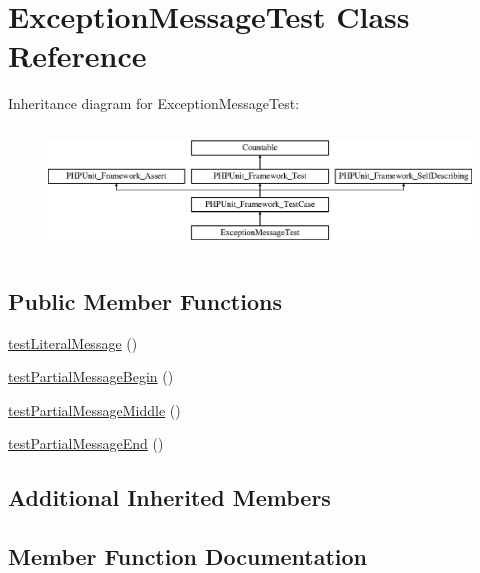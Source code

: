\hypertarget{class_exception_message_test}{}\section{Exception\+Message\+Test Class Reference}
\label{class_exception_message_test}
Inheritance diagram for Exception\+Message\+Test\+:\begin{figure}[H]
\begin{center}
\leavevmode
\includegraphics[height=3.303835cm]{class_exception_message_test}
\end{center}
\end{figure}
\subsection*{Public Member Functions}
\begin{DoxyCompactItemize}
\item 
\mbox{\hyperlink{class_exception_message_test_aa1d5fb2b0b99a9f65f4faec919624c44}{test\+Literal\+Message}} ()
\item 
\mbox{\hyperlink{class_exception_message_test_ad260415f8de6f6088d3f9a04f25423b4}{test\+Partial\+Message\+Begin}} ()
\item 
\mbox{\hyperlink{class_exception_message_test_a920980c2000d51a47b22d55f86cc53b9}{test\+Partial\+Message\+Middle}} ()
\item 
\mbox{\hyperlink{class_exception_message_test_aec35c08da8245ad136bf22900187b7fe}{test\+Partial\+Message\+End}} ()
\end{DoxyCompactItemize}
\subsection*{Additional Inherited Members}


\subsection{Member Function Documentation}
\mbox{\label{class_exception_message_test_aa1d5fb2b0b99a9f65f4faec919624c44}} 

